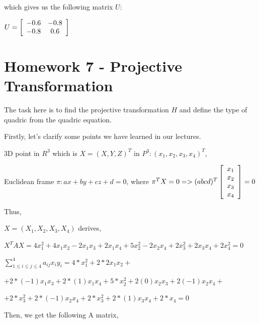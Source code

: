 \documentclass[]{article}
\begin{document}
which gives us the following matrix $U$:

\centerline {
	$U = \left[ {\begin{array}{*{20}c}
		-0.6 & -0.8 \\
		-0.8 & 0.6   
		\end{array} } \right]$
}

\section{Homework 7 - Projective Transformation}  
The task here is to find the projective transformation $H$ and define the type of quadric from the quadric equation.

Firstly, let's clarify some points we have learned in our lectures. 

\centerline {
	3D point in $R^3$ which is $X = (X, Y, Z)^T$ in $P^3 : (x_1, x_2, x_3, x_4)^T$,
}

\centerline {
	Euclidean frame $\pi : ax + by + cz +d = 0$, where
	$\pi^TX = 0 => (a b c d) ^T\left[ {\begin{array}{*{20}c}
		x_1 \\
		x_2 \\ 
		x_3 \\
		x_4  
		\end{array} } \right] = 0$	
}

Thus, 

\centerline {
	$X = (X_1, X_2, X_3, X_4)$ derives, 
}

\vspace{0.5em}

\centerline {
		$X^TAX = 4x_1^2 + 4x_1x_2 - 2x_1x_3 + 2x_1x_4 + 5x_2^2 - 2x_2x_4 + 2x_3^2 + 2x_3x_4 + 2x_4^2 = 0$
}

\vspace{0.5em}

\centerline {
	$\sum_{1 \leq i \leq  j \leq 4 }^{4} a_{ij}x_iy_i  = 4*x_1^2 + 2*2x_1x_2 + $ 
}

\vspace{0.5em}

\centerline {
	$+ 2 * (-1)x_1x_3 + 2* (1)x_1x_4 + 5*x_2^2 + 2(0)x_2x_3 + 2(-1)x_2x_4 +$
}

\vspace{0.5em}

\centerline {
	$+  2*x_3^2 + 2*(-1)x_2x_4 + 2* x_3^2 + 2*(1)x_3x_4 + 2*x_4 = 0$
}

\vspace{0.5em}

Then, we get the following A matrix,
\end{document}
